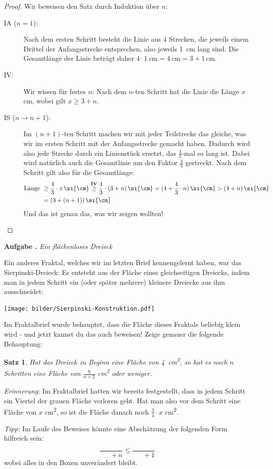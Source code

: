 \documentclass[a4paper,ngerman,12pt]{scrartcl}
\theoremstyle{definition}
\theoremstyle{plain}
\newtheorem{satz}[defn]{Satz}
\theoremstyle{remark}
\newlength{\aufgabenskip}
\newcounter{aufgabennummer}
\newenvironment{aufgabe}[1]{
	\refstepcounter{aufgabennummer}
	\textbf{Aufgabe \theaufgabennummer.} \emph{#1} \par
}{\vspace{\aufgabenskip}}
\begin{document}
\begin{proof}
	Wir beweisen den Satz durch Induktion über $n$:
	\begin{description}
		\item[IA ($n=1$):] Nach dem ersten Schritt besteht die Linie aus $4$ Strecken, die jeweils einem Drittel der Anfangsstrecke entsprechen, also jeweils \SI{1}{\cm} lang sind. Die Gesamtlänge der Linie beträgt daher $4 \cdot \SI{1}{\cm} = \SI{4}{\cm} = 3+1\,\si{\cm}$.
		\item[IV:] Wir wissen für festes $n$: Nach dem $n$-ten Schritt hat die Linie die Länge $x$ \si{\cm}, wobei gilt $x \geq 3+n$.
		\item[IS ($n\to n+1$):] Im $(n+1)$-ten Schritt machen wir mit jeder Teilstrecke das gleiche, was wir im ersten Schritt mit der Anfangsstrecke gemacht haben. Dadurch wird also jede Strecke durch ein Linienstück ersetzt, das $\frac{4}{3}$-mal so lang ist. Dabei wird natürlich auch die Gesamtlinie um den Faktor $\frac{4}{3}$ gestreckt. Nach dem Schritt gilt also für die Gesamtlänge:
			\begin{align*}
			\text{Länge } 	&\geq \frac{4}{3}\cdot x\,\si{\cm} \overset{\text{\textbf{IV}}}{\geq} \frac{4}{3}\cdot (3+n)\,\si{\cm} = (4+\frac{4}{3}\cdot n)\,\si{\cm} > (4+ n)\,\si{\cm} \\
							&= (3+ (n+1))\,\si{\cm}
			\end{align*}
		Und das ist genau das, was wir zeigen wollten!
	\end{description}
\end{proof}

\begin{aufgabe}{Ein flächenloses Dreieck}
	Ein anderes Fraktal, welches wir im letzten Brief kennengelernt haben, war das Sierpinski-Dreieck: Es entsteht aus der Fläche eines gleichseitigen Dreiecks, indem man in jedem Schritt ein (oder später mehrere) kleinere Dreiecke aus ihm ausschneidet:
	\begin{center}
		\texttt{[image: bilder/Sierpinski-Konstruktion.pdf]}
	\end{center}
	Im Fraktalbrief wurde behauptet, dass die Fläche dieses Fraktals beliebig klein wird - und jetzt kannst du das auch beweisen! Zeige genauer die folgende Behauptung:
	\begin{satz}
		Hat das Dreieck zu Beginn eine Fläche von \SI{4}{\cm\squared}, so hat es nach $n$ Schritten eine Fläche von $\frac{9}{n+2}$ \si{\cm\squared} oder weniger.
	\end{satz}
	\emph{Erinnerung:} Im Fraktalbrief hatten wir bereits festgestellt, dass in jedem Schritt ein Viertel der grauen Fläche verloren geht. Hat man also vor dem Schritt eine Fläche von $x$ \si{\cm\squared}, so ist die Fläche danach noch $\frac{3}{4}\cdot x$ \si{\cm\squared}.
	
	\emph{Tipp:} Im Laufe des Beweises könnte eine Abschätzung der folgenden Form hilfreich sein: 
		\[\frac{\boxed{\phantom{123}}}{\boxed{\phantom{123}} + n} \leq \frac{\boxed{\phantom{123}}}{\boxed{\phantom{123}} + 1} \]
	wobei alles in den Boxen unverändert bleibt.
\end{aufgabe}
\end{document}

